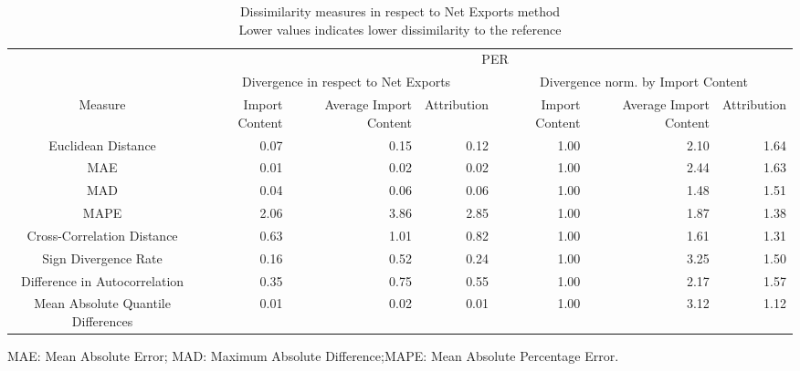 \begin{table}[t]
\caption*{
{\large Dissimilarity measures in respect to Net Exports method} \\ 
{\small Lower values indicates lower dissimilarity to the reference}
} 
\fontsize{15.0pt}{18.0pt}\selectfont
\begin{tabular*}{\linewidth}{@{\extracolsep{\fill}}crrrrrr}
\toprule
 & \multicolumn{6}{c}{PER} \\ 
\cmidrule(lr){2-7}
 & \multicolumn{3}{c}{Divergence in respect to Net Exports} & \multicolumn{3}{c}{Divergence norm. by Import Content} \\ 
\cmidrule(lr){2-4} \cmidrule(lr){5-7}
Measure & Import Content & Average Import Content & Attribution & Import Content & Average Import Content & Attribution \\ 
\midrule\addlinespace[2.5pt]
Euclidean Distance & 0.07 & 0.15 & 0.12 & 1.00 & 2.10 & 1.64 \\ 
MAE & 0.01 & 0.02 & 0.02 & 1.00 & 2.44 & 1.63 \\ 
MAD & 0.04 & 0.06 & 0.06 & 1.00 & 1.48 & 1.51 \\ 
MAPE & 2.06 & 3.86 & 2.85 & 1.00 & 1.87 & 1.38 \\ 
Cross-Correlation Distance & 0.63 & 1.01 & 0.82 & 1.00 & 1.61 & 1.31 \\ 
Sign Divergence Rate & 0.16 & 0.52 & 0.24 & 1.00 & 3.25 & 1.50 \\ 
Difference in Autocorrelation & 0.35 & 0.75 & 0.55 & 1.00 & 2.17 & 1.57 \\ 
Mean Absolute Quantile Differences & 0.01 & 0.02 & 0.01 & 1.00 & 3.12 & 1.12 \\ 
\bottomrule
\end{tabular*}
\begin{minipage}{\linewidth}
MAE: Mean Absolute Error; MAD: Maximum Absolute Difference;MAPE: Mean Absolute Percentage Error.\\
\end{minipage}
\end{table}

